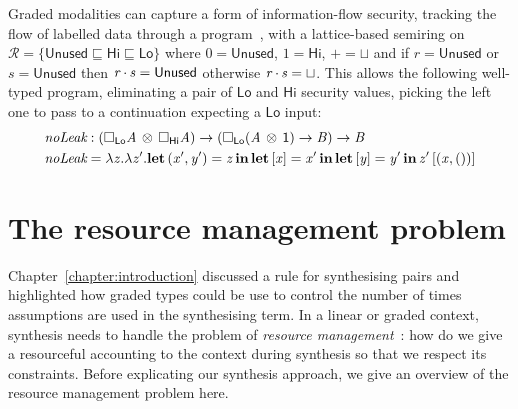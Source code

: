 \begin{example}%
\label{exm:security}
%
Graded modalities can capture a form of information-flow
security, tracking the flow of labelled data through a
program~\cite{DBLP:journals/pacmpl/OrchardLE19},
with a lattice-based semiring on
$\mathcal{R} = \{\mathsf{Unused} \sqsubseteq \mathsf{Hi} \sqsubseteq  \mathsf{Lo}\}$
where $0 = \mathsf{Unused}$, $1 = \mathsf{Hi}$, $+ = \sqcup$ and
if $r = \mathsf{Unused}$ or $s = \mathsf{Unused}$ then $\GRANULEnt{r}  \textcolor{coeffectColor}{\,\cdot\,}  \GRANULEnt{s} = \mathsf{Unused}$ otherwise $\GRANULEnt{r}  \textcolor{coeffectColor}{\,\cdot\,}  \GRANULEnt{s} = \sqcup$. This
allows the following well-typed program, eliminating a pair of
$\mathsf{Lo}$ and $\mathsf{Hi}$ security values, picking the left
one to pass to a continuation expecting a $\mathsf{Lo}$ input:
%
\begin{align*}
\textit{noLeak} & : (     \Box_{   \mathsf{Lo}   }  \mathit{A}    \, \otimes \,    \Box_{   \mathsf{Hi}   }  \mathit{A}     )  \rightarrow   (    \Box_{   \mathsf{Lo}   }  (   \mathit{A}  \, \otimes \,   \mathsf{1}    )    \rightarrow  \mathit{B}  )  \rightarrow  \mathit{B} \\
\textit{noLeak} & = \lambda  \mathit{z}  .    \lambda  \mathit{z'}  .    \textbf{let} \, ( \mathit{x'} ,  \mathit{y'} ) =  \mathit{z}  \, \textbf{in} \,    \textbf{let} \, [  \mathit{x}  ] =  \mathit{x'}  \, \textbf{in} \,    \textbf{let} \, [  \mathit{y}  ] =  \mathit{y'}  \, \textbf{in} \,   \mathit{z'} \, [   ( \mathit{x} ,  () )   ]
\end{align*}
\end{example}


\section{The resource management problem}
\label{sec:resource-management}

Chapter~\ref{chapter:introduction} discussed a rule for synthesising pairs and
highlighted how graded types could be use to control the number of times
assumptions are used in the synthesising term. In a linear or graded
context, synthesis needs to handle the problem of \emph{resource management}~\cite{harlandpym,CERVESATO2000133}: how do we give a resourceful accounting to the context during synthesis
so that we respect its constraints. Before explicating our synthesis approach,
we give an overview of the resource management problem here.

